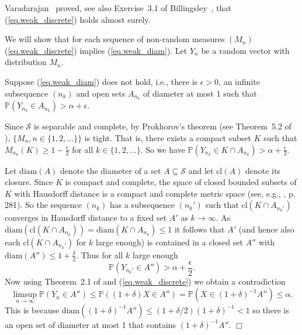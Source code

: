 \documentclass{article}
\newenvironment{proof}{\noindent{\bf Proof}}{\hspace*{\fill}$\Box$}
\newcommand{\pr}{\mathbb P}
\newcommand{\diam}{\mathrm{diam}}
\newcommand{\cl}{\mathrm{cl}}
\begin{document}
\begin{proof}
    Varadarajan~\cite{varadarajan} proved, see also Exercise~3.1 of Billingsley~\cite{billingsley_1999}, that (\ref{eq.weak_discrete}) holds almost surely.


We will show that for each sequence of non-random measures $(M_n)$ (\ref{eq.weak_discrete}) implies (\ref{eq.weak_diam}).
Let $Y_n$ be a random vector with distribution $M_n$.






    Suppose (\ref{eq.weak_diam}) does not hold, i.e., there is $\epsilon > 0$, an infinite subsequence $(n_k)$ and open sets $A_{n_k}$ of diameter at most 1 such that $\pr(Y_{n_k} \in A_{n_k}) > \alpha + \epsilon$. 

    Since $\mathcal{S}$ is separable and complete, by Prokhorov's theorem (see Theorem~5.2 of \cite{billingsley_1999}), $\{M_n, n\in\{1,2,\dots\}\}$ is tight.
    That is, there exists a compact subset $K$ such that $M_{n_k}(K) \ge 1 - \frac \epsilon 2$ for all $k \in \{1, 2, \dots\}$. So we have $\pr(Y_{n_k} \in K \cap A_{n_k}) > \alpha + \frac \epsilon 2$.


    
Let $\diam(A)$ denote the diameter of a set $A\subseteq\mathcal{S}$ and let $\cl(A)$ denote its closure.
    Since $K$ is compact and complete, the space of closed bounded subsets of $K$ with Hausdorff distance is a compact and complete metric space (see, e.g., \cite{munkres}, p. 281). So the sequence $(n_k)$ has a subsequence $(n_k')$ such that $\cl (K \cap A_{n_k'})$ converges in Hausdorff distance to a fixed set $A'$ as $k \to \infty$. As $\diam(\cl (K \cap A_{n_k})) = \diam(K \cap A_{n_k}) \le 1$ it follows that $A'$
    (and hence also each $\cl (K \cap A_{n_k'})$ for $k$ large enough) is contained in a closed set $A''$ with $\diam(A'') \le 1 + \frac \delta 2$.
    Thus for all $k$ large enough
    \begin{equation*} \pr(Y_{n_k'} \in A'') > \alpha + \frac \epsilon 2.
    \end{equation*}
    Now using Theorem~2.1 of \cite{billingsley_1999} and (\ref{eq.weak_discrete}) we obtain a contradiction
    \[
        \limsup_{n\to \infty} \pr(Y_n \in A'') \le \pr((1+\delta) X \in A'') = \pr(X \in (1+\delta)^{-1} A'') \le \alpha.
    \]
    This is because $\diam( (1+\delta)^{-1} A'') \le (1+\delta/2) (1+\delta)^{-1} < 1$ so there is an open set of diameter at most 1
    that contains  $(1+\delta)^{-1} A''$. \end{proof}
\end{document}
